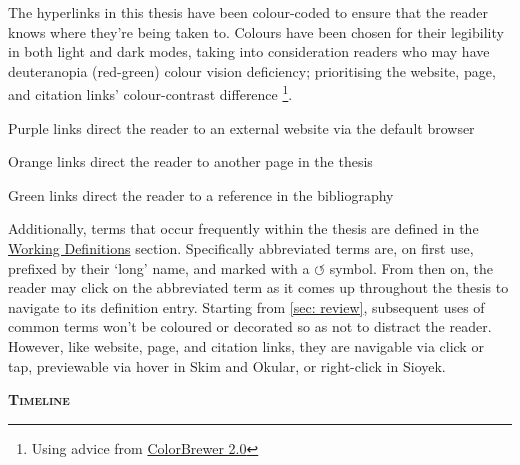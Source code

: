 \begin{SingleSpace}
\noindent The hyperlinks in this thesis have been colour-coded to ensure that the reader knows where they're being taken to. Colours have been chosen for their legibility in both light and dark modes, taking into consideration readers who may have deuteranopia (red-green) colour vision deficiency; prioritising the \textcolor{Hyurlcolor}{website}, \textcolor{Hylinkcolor}{page}, and \textcolor{Hycitecolor}{citation} links' colour-contrast difference \footnote{Using advice from \href{https://colorbrewer2.org/\#type=qualitative\&scheme=Dark2}{ColorBrewer 2.0}}.

\vspace*{0.25cm}
\noindent\textcolor{Hyurlcolor}{Purple} links direct the reader to an external website via the default browser

\noindent\textcolor{Hylinkcolor}{Orange} links direct the reader to another page in the thesis

\noindent\textcolor{Hycitecolor}{Green} links direct the reader to a reference in the bibliography

\vspace*{0.25cm}
\noindent Additionally, terms that occur frequently within the thesis are defined in the \hyperref[main]{Working Definitions} section. Specifically abbreviated terms are, on first use, prefixed by their `long' name, and marked with a \textcolor{Hylinkcolor}{$\circlearrowleft$} symbol. From then on, the reader may click on the abbreviated term as it comes up throughout the thesis to navigate to its definition entry. Starting from \autoref{sec: review}, subsequent uses of common terms won't be coloured or decorated so as not to distract the reader. However, like \textcolor{Hyurlcolor}{website}, \textcolor{Hylinkcolor}{page}, and \textcolor{Hycitecolor}{citation} links, they are navigable via click or tap, previewable via hover in Skim and Okular, or right-click in Sioyek.

\newpage
{}
{}
\begin{flushleft}
	\Huge \textsc{\textbf{Timeline}}
\end{flushleft}


\end{SingleSpace}
